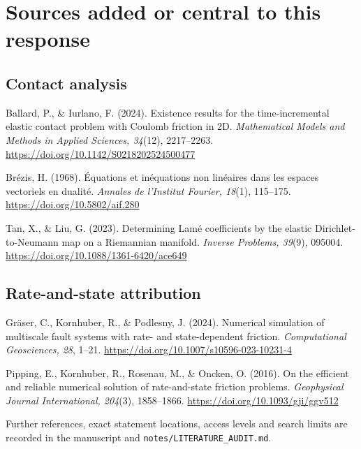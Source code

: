 \documentclass[11pt,a4paper]{article}
\begin{document}
\section*{Sources added or central to this response}

\subsection*{Contact analysis}
Ballard, P., \& Iurlano, F. (2024). Existence results for the time-incremental elastic contact problem with Coulomb friction in 2D. \emph{Mathematical Models and Methods in Applied Sciences, 34}(12), 2217–2263. \url{https://doi.org/10.1142/S0218202524500477}

Brézis, H. (1968). Équations et inéquations non linéaires dans les espaces vectoriels en dualité. \emph{Annales de l'Institut Fourier, 18}(1), 115–175. \url{https://doi.org/10.5802/aif.280}

Tan, X., \& Liu, G. (2023). Determining Lamé coefficients by the elastic Dirichlet-to-Neumann map on a Riemannian manifold. \emph{Inverse Problems, 39}(9), 095004. \url{https://doi.org/10.1088/1361-6420/ace649}

\subsection*{Rate-and-state attribution}
Gräser, C., Kornhuber, R., \& Podlesny, J. (2024). Numerical simulation of multiscale fault systems with rate- and state-dependent friction. \emph{Computational Geosciences, 28}, 1–21. \url{https://doi.org/10.1007/s10596-023-10231-4}

Pipping, E., Kornhuber, R., Rosenau, M., \& Oncken, O. (2016). On the efficient and reliable numerical solution of rate-and-state friction problems. \emph{Geophysical Journal International, 204}(3), 1858–1866. \url{https://doi.org/10.1093/gji/ggv512}

Further references, exact statement locations, access levels and search limits are recorded in the manuscript and \texttt{notes/LITERATURE\_AUDIT.md}.
\end{document}
